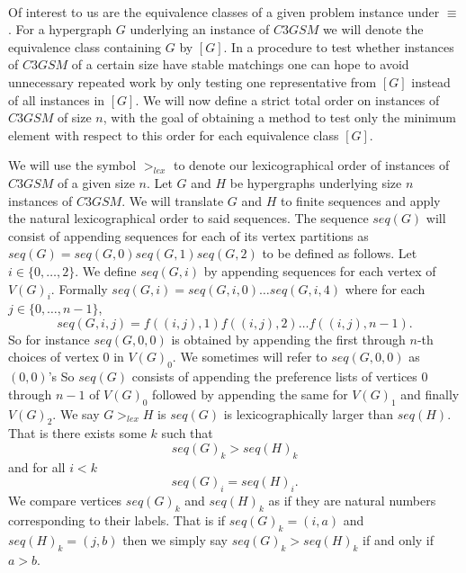 \paragraph{}
Of interest to us are the equivalence classes of a given problem instance under $\equiv$. For a hypergraph $G$ underlying an instance of $C3GSM$ we will denote the equivalence class containing $G$ by $[G]$. In a procedure to test whether instances of $C3GSM$ of a certain size have stable matchings one can hope to avoid unnecessary repeated work by only testing one representative from $[G]$ instead of all instances in $[G]$. We will now define a strict total order on instances of $C3GSM$ of size $n$, with the goal of obtaining a method to test only the minimum element with respect to this order for each equivalence class $[G]$.
\begin{definition}
We will use the symbol $>_{lex}$ to denote our lexicographical order of instances of $C3GSM$ of a given size $n$. Let $G$ and $H$ be hypergraphs underlying size $n$ instances of $C3GSM$. We will translate $G$ and $H$ to finite sequences and apply the natural lexicographical order to said sequences. The sequence $seq(G)$ will consist of appending sequences for each of its vertex partitions as $seq(G) = seq(G,0)seq(G,1)seq(G,2)$ to be defined as follows. Let $i \in \{0,\dots, 2\}$.  We define $seq(G,i)$ by appending sequences for each vertex of $V(G)_i$. Formally $seq(G,i) = seq(G,i,0)\dots seq(G,i,4)$ where for each $j \in \{0,\dots, n-1\}$,
$$seq(G,i,j) = f((i,j),1)f((i,j),2)\dots f((i,j),n-1).$$
So for instance $seq(G,0, 0)$ is obtained by appending the first through $n$-th choices of vertex $0$ in $V(G)_0$. We sometimes will refer to $seq(G,0,0)$ as $(0,0)$'s So $seq(G)$ consists of appending the preference lists of vertices $0$ through $n-1$ of $V(G)_0$ followed by appending the same for $V(G)_1$ and finally $V(G)_2$.
We say $G >_{lex} H$ is $seq(G)$ is lexicographically larger than $seq(H)$. That is there exists some $k$ such that
$$seq(G)_k > seq(H)_k$$
and for all $i < k$
$$seq(G)_i = seq(H)_i.$$
We compare vertices $seq(G)_k$ and $ seq(H)_k$ as if they are natural numbers corresponding to their labels. That is if $seq(G)_k = (i,a)$ and $seq(H)_k = (j,b)$ then we simply say $seq(G)_k > seq(H)_k$ if and only if $a>b$. 
\end{definition}
